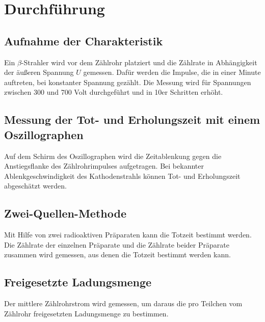 \section{Durchführung}
\label{sec:Durchführung}

\subsection{Aufnahme der Charakteristik}

Ein $\beta$-Strahler wird vor dem Zählrohr platziert und die Zählrate in Abhängigkeit der äußeren Spannung $U$ gemessen.
Dafür werden die Impulse, die in einer Minute auftreten, bei konstanter Spannung gezählt.
Die Messung wird für Spannungen zwischen 300 und 700 Volt durchgeführt und in 10er Schritten erhöht.

\subsection{Messung der Tot- und Erholungszeit mit einem Oszillographen}

Auf dem Schirm des Oszillographen wird die Zeitablenkung gegen die Anstiegsflanke des Zählrohrimpulses aufgetragen.
Bei bekannter Ablenkgeschwindigkeit des Kathodenstrahls können Tot- und Erholungszeit abgeschätzt werden.

\subsection{Zwei-Quellen-Methode}

Mit Hilfe von zwei radioaktiven Präparaten kann die Totzeit bestimmt werden.
Die Zählrate der einzelnen Präparate und die Zählrate beider Präparate zusammen wird gemessen, aus denen die Totzeit bestimmt werden kann.


\subsection{Freigesetzte Ladungsmenge}

Der mittlere Zählrohrstrom wird gemessen, um daraus die pro Teilchen vom Zählrohr freigesetzten Ladungsmenge zu bestimmen.
